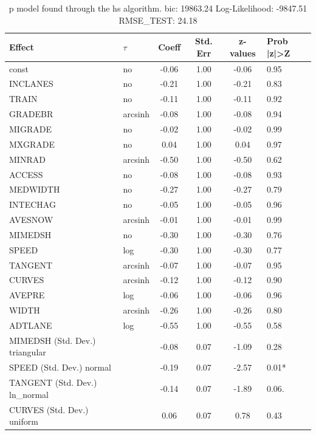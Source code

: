 \begin{table}
	\caption{p model found through the hs algorithm. bic: 19863.24 Log-Likelihood: -9847.51 RMSE_TEST: 24.18}
	\begin{center}
		\begin{tabular}{|l|l|c|c|c|l|}
			\hline
			Effect & $\tau$ & Coeff & Std. Err & z-values & Prob |z|>Z \\
			\hline
			const & no & -0.06 & 1.00 & -0.06 & 0.95 \\
			\hline
			INCLANES & no & -0.21 & 1.00 & -0.21 & 0.83 \\
			\hline
			TRAIN & no & -0.11 & 1.00 & -0.11 & 0.92 \\
			\hline
			GRADEBR & arcsinh & -0.08 & 1.00 & -0.08 & 0.94 \\
			\hline
			MIGRADE & no & -0.02 & 1.00 & -0.02 & 0.99 \\
			\hline
			MXGRADE & no & 0.04 & 1.00 & 0.04 & 0.97 \\
			\hline
			MINRAD & arcsinh & -0.50 & 1.00 & -0.50 & 0.62 \\
			\hline
			ACCESS & no & -0.08 & 1.00 & -0.08 & 0.93 \\
			\hline
			MEDWIDTH & no & -0.27 & 1.00 & -0.27 & 0.79 \\
			\hline
			INTECHAG & no & -0.05 & 1.00 & -0.05 & 0.96 \\
			\hline
			AVESNOW & arcsinh & -0.01 & 1.00 & -0.01 & 0.99 \\
			\hline
			MIMEDSH & no & -0.30 & 1.00 & -0.30 & 0.76 \\
			\hline
			SPEED & log & -0.30 & 1.00 & -0.30 & 0.77 \\
			\hline
			TANGENT & arcsinh & -0.07 & 1.00 & -0.07 & 0.95 \\
			\hline
			CURVES & arcsinh & -0.12 & 1.00 & -0.12 & 0.90 \\
			\hline
			AVEPRE & log & -0.06 & 1.00 & -0.06 & 0.96 \\
			\hline
			WIDTH & arcsinh & -0.26 & 1.00 & -0.26 & 0.80 \\
			\hline
			ADTLANE & log & -0.55 & 1.00 & -0.55 & 0.58 \\
			\hline
			MIMEDSH (Std. Dev.) triangular &  & -0.08 & 0.07 & -1.09 & 0.28 \\
			\hline
			SPEED (Std. Dev.) normal &  & -0.19 & 0.07 & -2.57 & 0.01* \\
			\hline
			TANGENT (Std. Dev.) ln_normal &  & -0.14 & 0.07 & -1.89 & 0.06. \\
			\hline
			CURVES (Std. Dev.) uniform &  & 0.06 & 0.07 & 0.78 & 0.43 \\

\end{tabular}
\end{center}
\end{table}
